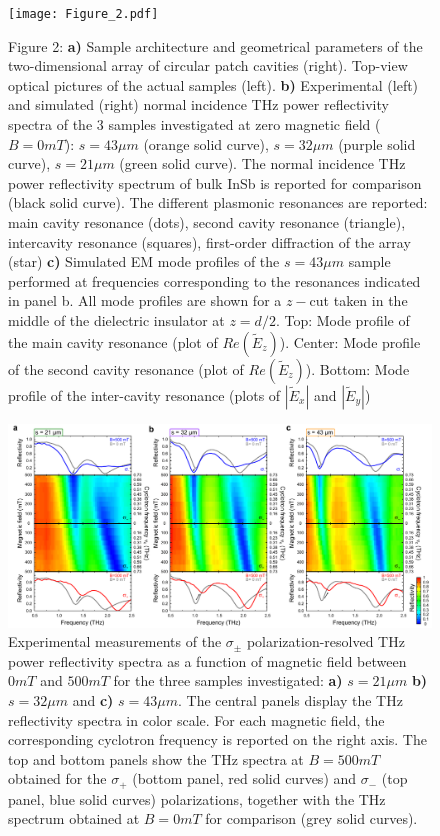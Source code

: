 \documentclass[twocolumn]{article}
\begin{document}
\newpage
\begin{figure}[p]
	\centering %
	\texttt{[image: Figure\_2.pdf]}
	\caption{Figure 2: \textbf{a)} Sample architecture and geometrical parameters of the two-dimensional array of circular patch cavities (right). Top-view optical pictures of the actual samples (left). \textbf{b)} Experimental (left) and simulated (right) normal incidence THz power reflectivity spectra of the 3 samples investigated at zero magnetic field ($B=0mT$): $s=43\mu m$ (orange solid curve), $s=32\mu m$ (purple solid curve), $s=21\mu m$ (green solid curve). The normal incidence THz power reflectivity spectrum of bulk InSb is reported for comparison (black solid curve). The different plasmonic resonances are reported: main cavity resonance (dots), second cavity resonance (triangle), intercavity resonance (squares), first-order diffraction of the array (star) \textbf{c)} Simulated EM mode profiles of the $s=43\mu m$ sample performed at frequencies corresponding to the resonances indicated in panel b. All mode profiles are shown for a $z-$cut taken in the middle of the dielectric insulator at $z=d/2$. Top: Mode profile of the main cavity resonance (plot of $Re(\tilde{E}_z)$). Center: Mode profile of the second cavity resonance (plot of $Re(\tilde{E}_z)$). Bottom: Mode profile of the inter-cavity resonance (plots of $|\tilde{E}_x|$ and $|\tilde{E}_y|$)}
	\label{fig:2}
\end{figure}
\newpage
\begin{figure}[htbp]
	\centering %
	\includegraphics[width=\textwidth]{Figure_3.pdf}
	\caption{Experimental measurements of the ${\sigma }_{\pm }$ polarization-resolved THz power reflectivity spectra as a function of magnetic field between $0mT$ and $500mT$ for the three samples investigated: \textbf{a)} $s=21 \mu m$ \textbf{b)} $s=32 \mu m$ and \textbf{c)} $s=43 \mu m$. The central panels display the THz reflectivity spectra in color scale. For each magnetic field, the corresponding cyclotron frequency is reported on the right axis. The top and bottom panels show the THz spectra at $B=500mT$ obtained for the ${\sigma }_+$ (bottom panel, red solid curves) and ${\sigma }_-$ (top panel, blue solid curves) polarizations, together with the THz spectrum obtained at $B=0mT$ for comparison (grey solid curves).}
	\label{fig:3}
\end{figure}
\end{document}
